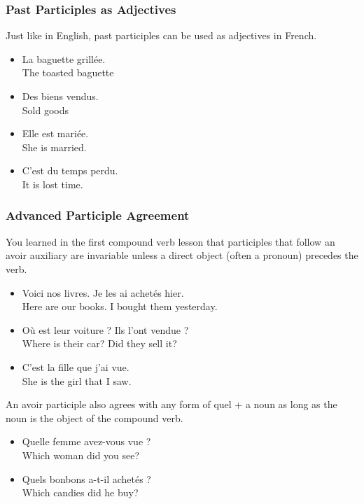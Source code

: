 \subsubsection{Past Participles as Adjectives}

Just like in English, past participles can be used as adjectives in French.

\begin{itemize}
  \item  La baguette grill{\'e}e. \\ The toasted baguette
	\item  Des biens vendus. \\ Sold goods
	\item  Elle est mari{\'e}e. \\ She is married.
	\item  C'est du temps perdu. \\ It is lost time.
\end{itemize}

\subsubsection{Advanced Participle Agreement}

You learned in the first compound verb lesson that participles that follow an avoir auxiliary are invariable unless a direct object (often a pronoun) precedes the verb.

\begin{itemize}
  \item  Voici nos livres. Je les ai achet{\'e}s hier. \\ Here are our books. I bought them yesterday.
	\item  O{\`u} est leur voiture ? Ils l'ont vendue ? \\ Where is their car? Did they sell it?
	\item  C'est la fille que j'ai vue. \\ She is the girl that I saw.
\end{itemize}

An avoir participle also agrees with any form of quel + a noun as long as the noun is the object of the compound verb.

\begin{itemize}
  \item  Quelle femme avez-vous vue ? \\ Which woman did you see?
	\item  Quels bonbons a-t-il achet{\'e}s ? \\ Which candies did he buy?
\end{itemize}

